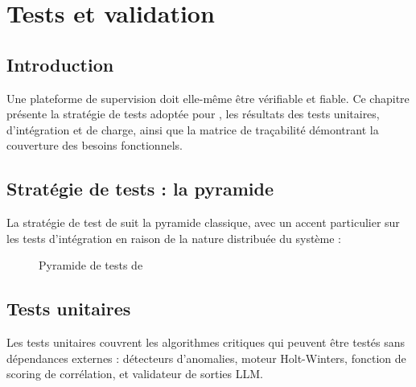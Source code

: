 \chapter{Tests et validation}

\section*{Introduction}

Une plateforme de supervision doit elle-même être vérifiable et fiable. Ce
chapitre présente la stratégie de tests adoptée pour \caimp{}, les résultats
des tests unitaires, d'intégration et de charge, ainsi que la matrice de
traçabilité démontrant la couverture des besoins fonctionnels.

\section{Stratégie de tests : la pyramide}

La stratégie de test de \caimp{} suit la pyramide classique, avec un accent
particulier sur les tests d'intégration en raison de la nature distribuée
du système :

\begin{figure}[H]
\centering
{}
\caption{Pyramide de tests de \caimp{}}
\label{fig:pyramid}
\end{figure}

\section{Tests unitaires}

Les tests unitaires couvrent les algorithmes critiques qui peuvent être testés
sans dépendances externes : détecteurs d'anomalies, moteur Holt-Winters,
fonction de scoring de corrélation, et validateur de sorties LLM.

